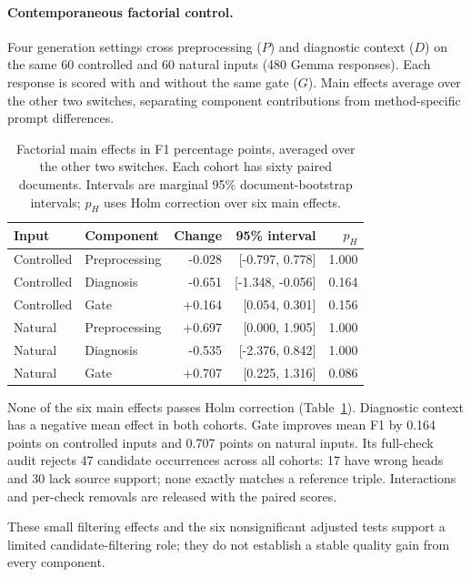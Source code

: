 \paragraph{Contemporaneous factorial control.}
\label{sec:eval:factorial}
Four generation settings cross preprocessing ($P$) and diagnostic context
($D$) on the same 60 controlled and 60 natural inputs (480 Gemma responses).
Each response is scored with and without the same gate ($G$). Main effects
average over the other two switches, separating component contributions
from method-specific prompt differences.

\begin{table}[t]

\centering

\caption{Factorial main effects in F1 percentage points, averaged over the other two switches. Each cohort has sixty paired documents. Intervals are marginal 95\% document-bootstrap intervals; $p_H$ uses Holm correction over six main effects.}

\label{tab:recovery_factorial}

\small

\begin{tabular}{llrrr}

\toprule

Input & Component & Change & 95\% interval & $p_H$ \\

\midrule

Controlled & Preprocessing & -0.028 & [-0.797, 0.778] & 1.000 \\

Controlled & Diagnosis & -0.651 & [-1.348, -0.056] & 0.164 \\

Controlled & Gate & +0.164 & [0.054, 0.301] & 0.156 \\

Natural & Preprocessing & +0.697 & [0.000, 1.905] & 1.000 \\

Natural & Diagnosis & -0.535 & [-2.376, 0.842] & 1.000 \\

Natural & Gate & +0.707 & [0.225, 1.316] & 0.086 \\

\bottomrule

\end{tabular}

\end{table}

None of the six main effects passes Holm correction (Table~\ref{tab:recovery_factorial}). Diagnostic context has a negative mean effect in both cohorts. Gate improves mean F1 by 0.164 points on controlled inputs and 0.707 points on natural inputs. Its full-check audit rejects 47 candidate occurrences across all cohorts: 17 have wrong heads and 30 lack source support; none exactly matches a reference triple. Interactions and per-check removals are released with the paired scores.

These small filtering effects and the six nonsignificant adjusted tests
support a limited candidate-filtering role; they do not establish a stable
quality gain from every component.
